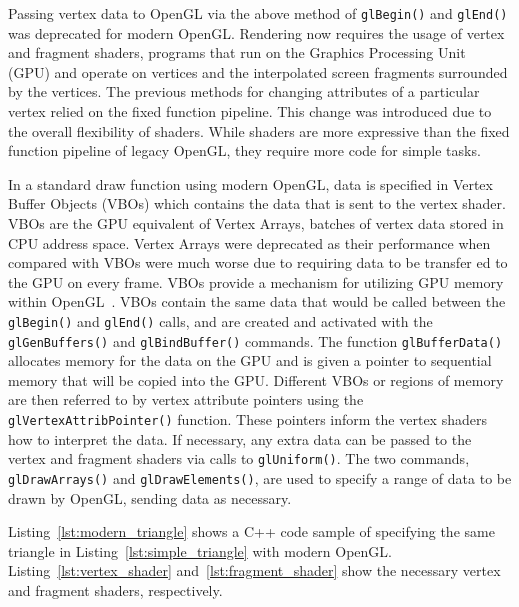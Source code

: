 Passing vertex data to OpenGL via the above method of {\tt glBegin()} and {\tt glEnd()} was deprecated for modern OpenGL\@. Rendering now requires the usage of vertex and fragment shaders, 
programs that run on the Graphics Processing Unit (GPU) and operate on vertices and the interpolated 
screen fragments surrounded by the vertices.  The previous methods for changing attributes of a particular vertex relied on the fixed function pipeline. This change was introduced due to the overall flexibility of shaders. While shaders are more expressive than the fixed function pipeline of legacy OpenGL, they require more code for simple tasks.

In a standard draw function using modern OpenGL, data is specified in Vertex Buffer Objects (VBOs) 
which contains the data that is sent to the vertex shader. VBOs are the GPU equivalent of Vertex Arrays, batches of vertex data stored in CPU address space. Vertex Arrays were deprecated as their performance when compared with VBOs were much worse due to requiring data to be transfer ed to the GPU on every frame. VBOs provide a mechanism for utilizing GPU memory within OpenGL~\cite{opengl_3_specification}. VBOs contain the same data that 
would be called between the {\tt glBegin()} and {\tt glEnd()} calls, and are created and activated with 
the {\tt glGenBuffers()} and {\tt glBindBuffer()} commands. The function {\tt glBufferData()} allocates memory for the data on the GPU and is given a pointer to sequential memory that will be copied into the GPU\@. Different VBOs or regions of memory are then referred to by vertex attribute pointers using the {\tt glVertexAttribPointer()} function. These pointers inform the vertex shaders how to interpret the data. If necessary, any extra data can be passed to the vertex and fragment shaders via calls to {\tt glUniform()}. The two commands, {\tt glDrawArrays()} and {\tt glDrawElements()}, are used to specify a range of data to be drawn by OpenGL, sending data as necessary.

Listing~\ref{lst:modern_triangle} shows a C++ code sample of specifying the same triangle in Listing~\ref{lst:simple_triangle} with modern OpenGL\@. Listing~\ref{lst:vertex_shader} and~\ref{lst:fragment_shader} show the necessary vertex and fragment shaders, respectively.


